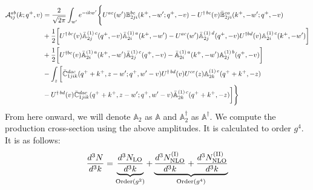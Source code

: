 \documentclass[aps,prd,amsmath,amssymb,nofootinbib]{revtex4-2}
\def\mf#1{\mathbb{#1}}
\numberwithin{equation}{section}
\begin{document}
\begin{align}
     {\cal A}^{ab}_{ij}(k; q^+, v) & = \frac{2}{\sqrt{2\pi}} \int_{w^{\prime}}e^{-i k w^\prime}\Bigg\{U^{ac}(w^{\prime}) \mf{B}^{bc}_{2ji}(k^{+},-w^{\prime};q^{+},-v)-U^{\dagger\, bc}(v)\Bar{\mf{B}}^{ca}_{2ji}(k^{+},-w^{\prime}; q^{+},-v)\notag \\ & +\frac{1}{2}\bigg[U^{\dagger\, bc}(v)\Bar{\mf{A}}^{(1)\, c}_{2j}(q^{+},-v)\Bar{\mf{A}}^{(1)\, a}_{2i}(k^{+},-w^{\prime})-U^{ac}(w^{\prime}) \Bar{\mf{A}}^{(1)\, d}_{2j}(q^{+},-v)U^{\dagger bd}(v) \mf{A}^{(1)\, c}_{2i}(k^{+},- w^{\prime})\bigg]\notag \\ & +\frac{1}{2}\bigg[U^{\dagger bc}(v)\Bar{\mf{A}}^{(1)\, a}_{2i}(k^{+},- w^{\prime})\Bar{\mf{A}}^{(1)\, c}_{2j}(q^{+},-v)-\Bar{\mf{A}}^{(1)\, a}_{2i}(k^{+},- w^{\prime}) \mf{A}^{(1)\, b}_{2j}(q^{+},- v)\bigg]\notag \\ & -\int_{z}\bigg[\Bar{\mf{C}}^{dac}_{1jik}(q^{+}+k^{+},z-w^{\prime}; q^{+},w^{\prime}-v)U^{\dagger\, bd}(v)U^{ce}(z) \mf{A}^{(1)\,e}_{2k}(q^{+}+k^{+},-z)\notag \\ &-U^{\dagger\, bd}(v) \Bar{\mf{C}}^{dac}_{1jik}(q^{+}+k^{+},z-w^{\prime}; q^{+},w^{\prime}-v)\Bar{\mf{A}}^{(1)\,c}_{2k}(q^{+}+k^{+},-z)\bigg]\Bigg\}
\end{align}
From here onward, we will denote $\mf{A}_{2}$ as $\mf{A}$ and $\mf{A}^{\dagger}_{2}$ as $\mf{A}^{\dagger}$. We compute the production cross-section using the above amplitudes. It is calculated to order $g^{4}$. It is as follows:
\begin{align}
    \frac{d^{3}N}{d^{3}k} = 
     \underbrace{\frac{d^{3}N_{\rm LO}}{d^{3}k}}_{\text{Order}(g^{2})}
     + 
    \underbrace{ \frac{d^{3}N_{\rm NLO}^{\rm (I)}}{d^{3}k}
     + \frac{d^{3}N_{\rm NLO}^{\rm (II)}}{d^{3}k}}_{\text{Order}(g^{4})}
\end{align}
\end{document}
